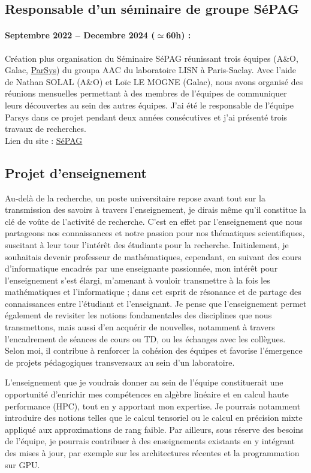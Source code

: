 \subsection{Responsable d'un séminaire de groupe SéPAG}

\paragraph*{Septembre 2022 -- Decembre 2024 ($\simeq$60h) :}
Création plus organisation du Séminaire SéPAG réunissant trois équipes (A\&O, Galac, \underline{ParSys}) du groupa AAC du laboratoire LISN à Paris-Saclay.
Avec l'aide de Nathan SOLAL (A\&O) et Loïc LE MOGNE (Galac), nous avons organisé des réunions mensuelles permettant à des membres de l'équipes de communiquer leurs découvertes au sein des autres équipes.
J'ai été le responsable de l'équipe Parsys dans ce projet pendant deux années consécutives et j'ai présenté trois travaux de recherches.\\
Lien du site : \href{https://hebergement.universite-paris-saclay.fr/sepag/}{SéPAG}
\normalsize

\subsection{Projet d'enseignement}
Au-delà de la recherche, un poste universitaire repose avant tout sur la
transmission des savoirs à travers l'enseignement, je dirais même qu'il
constitue la clé de voûte de l'activité de recherche. C'est en effet par
l'enseignement que nous partageons nos connaissances et notre passion pour nos
thématiques scientifiques, suscitant à leur tour l'intérêt des étudiants pour
la recherche. Initialement, je souhaitais devenir professeur de mathématiques,
cependant, en suivant des cours d'informatique encadrés par une enseignante
passionnée, mon intérêt pour l'enseignement s'est élargi, m'amenant à vouloir
transmettre à la fois les mathématiques et l'informatique ; dans cet esprit de
résonance et de partage des connaissances entre l'étudiant et l'enseignant. Je
pense que l'enseignement permet également de revisiter les notions
fondamentales des disciplines que nous transmettons, mais aussi d'en acquérir
de nouvelles, notamment à travers l'encadrement de séances de cours ou TD, ou
les échanges avec les collègues. Selon moi, il contribue à renforcer la
cohésion des équipes et favorise l'émergence de projets pédagogiques
transversaux au sein d'un laboratoire.

L'enseignement que je voudrais donner au sein de l'équipe \equipe constituerait
une opportunité d'enrichir mes compétences en algèbre linéaire et en calcul
haute performance (HPC), tout en y apportant mon expertise. Je pourrais
notamment introduire des notions telles que le calcul tensoriel ou le calcul en
précision mixte appliqué aux approximations de rang faible. Par ailleurs, sous
réserve des besoins de l'équipe, je pourrais contribuer à des enseignements
existants en y intégrant des mises à jour, par exemple sur les architectures
récentes et la programmation sur GPU.

